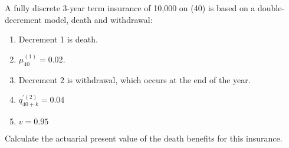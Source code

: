 A fully discrete 3-year term insurance of 10,000 on (40) is based on a 
double-decrement model, death and withdrawal:
\begin{enumerate}
\item Decrement 1 is death.
\item $\mu^{(1)}_{40}=0.02$.
\item Decrement 2 is withdrawal, which occurs at the end of the year.
\item $q_{40+k}^{'(2)}=0.04$
\item $v = 0.95$
\end{enumerate}
Calculate the actuarial present value of the death benefits for this insurance.

\showsol{}
